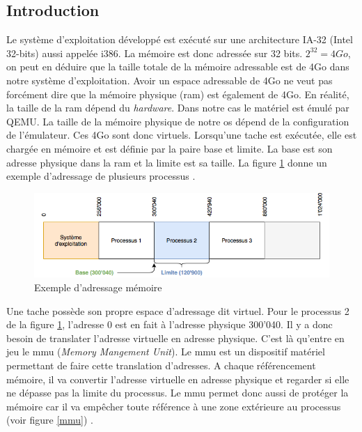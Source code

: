\label{memory}

\subsection{Introduction}
Le système d'exploitation développé est exécuté sur une architecture \acrshort{IA-32}
(Intel 32-bits) aussi appelée i386. La mémoire est donc adressée sur 32 bits.
$2^{32}=4Go$, on peut en déduire que la taille totale de la mémoire adressable est
de 4Go dans notre système d'exploitation. Avoir un espace adressable de 4Go ne veut
pas forcément dire que la mémoire physique (\acrshort{ram}) est également de 4Go.
En réalité, la taille de la \acrshort{ram} dépend du \textit{hardware}. Dans notre
cas le matériel est émulé par QEMU. La taille de la mémoire physique de notre \acrshort{os}
dépend de la configuration de l'émulateur. Ces 4Go sont donc virtuels. Lorsqu'une
tache est exécutée, elle est chargée en mémoire et est définie par la paire base
et limite. La base est son adresse physique dans la \acrshort{ram} et la limite
est sa taille. La figure \ref{ex_base_limit} donne un exemple d'adressage de plusieurs
processus \cite{ref42}.

\begin{figure}[!h]
  \centering
  \includegraphics[scale=0.6]{images/ex_base_limit.png}
  \caption{Exemple d'adressage mémoire}
  \label{ex_base_limit}
\end{figure}

Une tache possède son propre espace d'adressage dit virtuel. Pour le processus 2
de la figure \ref{ex_base_limit}, l'adresse 0 est en fait à l'adresse physique
300'040. Il y a donc besoin de translater l'adresse virtuelle en adresse physique.
C'est là qu'entre en jeu le \acrshort{mmu} (\textit{Memory Mangement Unit}). Le \acrshort{mmu}
est un dispositif matériel permettant de faire cette translation d'adresses. A chaque
référencement mémoire, il va convertir l'adresse virtuelle en adresse physique et
regarder si elle ne dépasse pas la limite du processus. Le \acrshort{mmu} permet donc
aussi de protéger la mémoire car il va empêcher toute référence à une zone extérieure
au processus (voir figure \ref{mmu}) \cite{ref42}.

